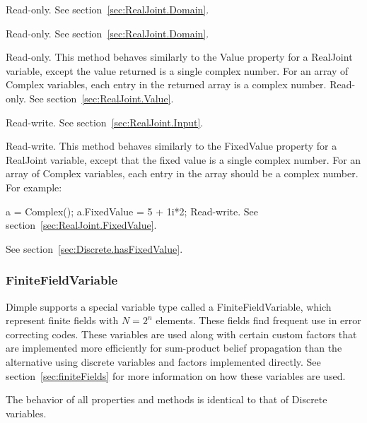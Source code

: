

Read-only.  See section~\ref{sec:RealJoint.Domain}.


Read-only.  See section~\ref{sec:RealJoint.Domain}.


\ifmatlab
Read-only.  This method behaves similarly to the Value property for a RealJoint variable, except the value returned is a single complex number.  For an array of Complex variables, each entry in the returned array is a complex number.
\fi
\ifjava
Read-only.  See section~\ref{sec:RealJoint.Value}.
\fi


Read-write.  See section~\ref{sec:RealJoint.Input}.


\ifmatlab
Read-write.  This method behaves similarly to the FixedValue property for a RealJoint variable, except that the fixed value is a single complex number.  For an array of Complex variables, each entry in the array should be a complex number.  For example:

a = Complex();
a.FixedValue = 5 + 1i*2;
\fi
\ifjava
Read-write.  See section~\ref{sec:RealJoint.FixedValue}.
\fi



See section~\ref{sec:Discrete.hasFixedValue}.


\subsubsection{FiniteFieldVariable}

Dimple supports a special variable type called a FiniteFieldVariable, which represent finite fields with $N=2^{n}$ elements. These fields find frequent use in error correcting codes.  These variables are used along with certain custom factors that are implemented more efficiently for sum-product belief propagation than the alternative using discrete variables and factors implemented directly.  See section~\ref{sec:finiteFields} for more information on how these variables are used.

The behavior of all properties and methods is identical to that of Discrete variables.


